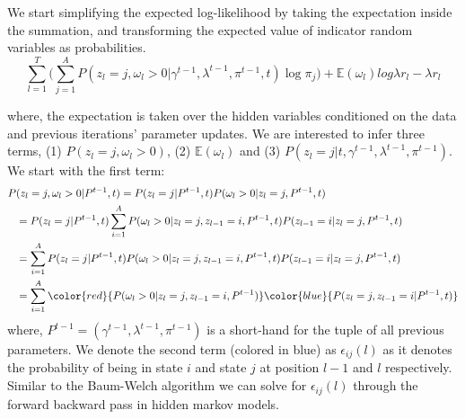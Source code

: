 We start simplifying the expected log-likelihood by taking the expectation inside the summation, and transforming the expected value of indicator random variables as probabilities. 
\begin{equation}
     \sum\limits_{l=1}^{T} \Big( \sum\limits_{j=1}^{A} P(z_l = j, \omega_l > 0 \vert \gamma^{t-1}, \lambda^{t-1}, \pi^{t-1}, t) \log \pi_j \Big) + \mathbb{E}(\omega_l) log \lambda r_l - \lambda r_l
\end{equation}

where, the expectation is taken over the hidden variables conditioned on the data and previous iterations' parameter updates. We are interested to infer three terms, (1) $P(z_l = j, \omega_l > 0)$, (2) $\mathbb{E}(\omega_l)$ and (3) $P(z_l = j | t, \gamma^{t-1}, \lambda^{t-1}, \pi^{t-1})$. We start with the first term:
\begin{align}
    P&(z_l = j, \omega_l > 0 \vert P^{t-1}, t) = P(z_l = j \vert P^{t-1}, t) P(\omega_l > 0 \vert z_l = j, P^{t-1}, t) \nonumber \\
    &= P(z_l = j \vert P^{t-1}, t) \sum\limits_{i=1}^{A} P(\omega_l > 0 \vert z_l = j, z_{l-1} = i, P^{t-1}, t) P(z_{l-1} = i \vert z_l = j, P^{t-1}, t) \nonumber \\
    &= \sum\limits_{i=1}^{A} P(z_l = j \vert P^{t-1}, t) P(\omega_l > 0 \vert z_l = j, z_{l-1} = i, P^{t-1}, t) P(z_{l-1} = i \vert z_l = j, P^{t-1}, t) \nonumber \\
    &= \sum\limits_{i=1}^{A} \color{red}{P(\omega_l > 0 \vert z_l = j, z_{l-1} = i, P^{t-1})} \color{blue}{P(z_l = j, z_{l-1} = i \vert P^{t-1}, t)}
\label{eq:hmm_estep}
\end{align}
where, $P^{t-1} = (\gamma^{t-1}, \lambda^{t-1}, \pi^{t-1})$ is a short-hand for the tuple of all previous parameters. We denote the second term (colored in blue) as $\epsilon_{ij}(l)$ as it denotes the probability of being in state $i$ and state $j$ at position $l-1$ and $l$ respectively. Similar to the Baum-Welch algorithm we can solve for $\epsilon_{ij}(l)$ through the forward backward pass in hidden markov models. 

